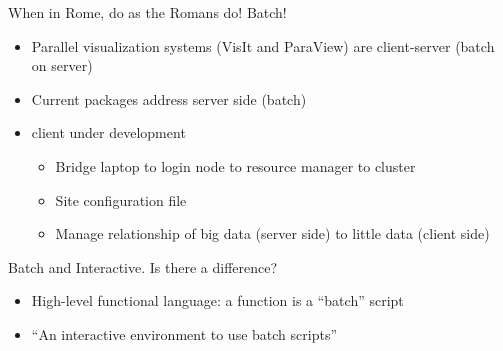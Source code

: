 \begin{frame}
  \begin{block}{When in Rome, do as the Romans do! \hfill Batch!}
    \begin{itemize}
    \item Parallel visualization systems (VisIt and ParaView) are
      client-server (batch on server)
    \item Current \pbdR packages address server side (batch)
    \item \pbdR client under development
      \begin{itemize}
      \item Bridge laptop to login node to resource manager to cluster
      \item Site configuration file
      \item Manage relationship of big data (server side) to little
        data (client side)
      \end{itemize}
    \end{itemize}
  \end{block}
  \begin{block}{Batch and Interactive. Is there a difference?}
    \begin{itemize}
    \item High-level functional language: a function is a ``batch'' script
    \item \R ``An interactive environment to use batch scripts''
    \end{itemize}
  \end{block}
\end{frame}
